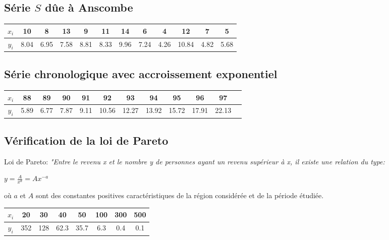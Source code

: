 \subsection*{Série $S$ dûe à Anscombe}

\begin{tabular}{|c|c|c|c|c|c|c|c|c|c|c|c|}
    \hline
    $x_i$ & 10 &  8  & 13&  9  & 11  &14  &6  & 4 &  12  &7  & 5 \\
    \hline
    $y_i$ &8.04&6.95&7.58&8.81&8.33&9.96&7.24&4.26&10.84&4.82&5.68\\
    \hline
\end{tabular}
\subsection*{Série chronologique avec accroissement exponentiel}
\begin{tabular}{|c|c|c|c|c|c|c|c|c|c|c|c|}
    \hline
    $x_i$ &88&89&90&91&92&93&94&95&96&97 \\
    \hline
    $y_i$ &5.89&6.77&7.87&9.11&10.56&12.27&13.92&15.72&17.91&22.13\\
    \hline
\end{tabular}
\subsection*{Vérification de la loi de Pareto}
Loi de Pareto: \textit{"Entre le revenu x et le nombre y de personnes ayant un revenu supérieur à x, il existe une relation du type:}\\
\begin{center}
    $y=\frac{A}{x^a}=Ax^{-a}$
\end{center}
où $a$ et $A$ sont des constantes positives caractéristiques de la région considérée et de la période étudiée. \vspace{8pt}\\
\begin{tabular}{|c|c|c|c|c|c|c|c|}
    \hline
    $x_i$ &20&30&40&50&100&300&500 \\
    \hline
    $y_i$ &352&128&62.3&35.7&6.3&0.4&0.1\\
    \hline
\end{tabular}

